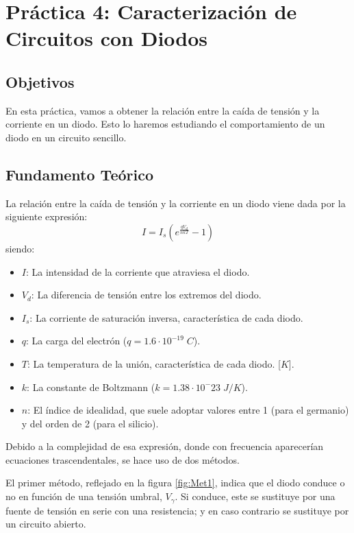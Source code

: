 \chapter{Práctica 4: Caracterización de Circuitos con Diodos}

\section{Objetivos}
En esta práctica, vamos a obtener la relación entre la caída de tensión y la corriente en un diodo. Esto lo haremos estudiando el comportamiento de un diodo en un circuito sencillo.

\section{Fundamento Teórico}
La relación entre la caída de tensión y la corriente en un diodo viene dada por la siguiente expresión:
\begin{equation}\label{Ec:Rel_I-V}
    I = I_s \left( e^\frac{qV_d}{nkT} - 1\right)
\end{equation}
siendo:
\begin{itemize}
    \item $I$: La intensidad de la corriente que atraviesa el diodo.
    \item $V_d$: La diferencia de tensión entre los extremos del diodo.
    \item $I_s$: La corriente de saturación inversa, característica de cada diodo.
    \item $q$: La carga del electrón ($q = 1.6\cdot10^{-19}\;C$).
    \item $T$: La temperatura de la unión, característica de cada diodo. [$K$].
    \item $k$: La constante de Boltzmann ($k = 1.38 \cdot 10^-23\;J/K$).
    \item $n$: El índice de idealidad, que suele adoptar valores entre 1 (para el germanio) y del orden de 2 (para el silicio).
\end{itemize}

Debido a la complejidad de esa expresión, donde con frecuencia aparecerían ecuaciones trascendentales, se hace uso de dos métodos.

El primer método, reflejado en la figura \ref{fig:Met1}, indica que el diodo conduce o no en función de una tensión umbral, $V_\gamma$. Si conduce, este se sustituye por una fuente de tensión en serie con una resistencia; y en caso contrario se sustituye por un circuito abierto.

